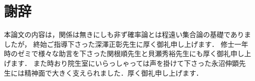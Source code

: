 \chapter*{謝辞}
	本論文の内容は，関係は無きにしも非ず確率論とは程遠い集合論の基礎でありましたが，
	終始ご指導下さった深澤正彰先生に厚く御礼申し上げます．
	修士一年時のゼミで様々な助言を下さった関根順先生と貝瀬秀裕先生にも厚く御礼申し上げます．
	また時おり院生室にいらっしゃっては声を掛けて下さった永沼伸顕先生には精神面で大きく支えられました．厚く御礼申し上げます．
